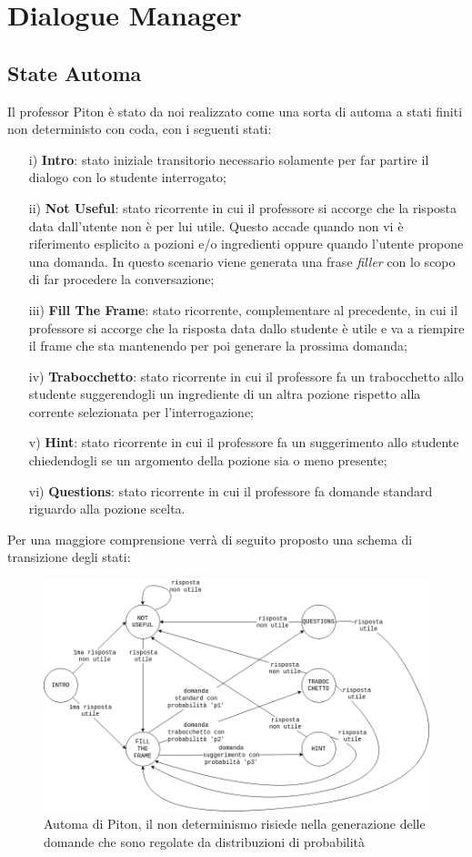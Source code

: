 \section{Dialogue Manager}
\subsection{State Automa}
Il professor Piton è stato da noi realizzato come una sorta di automa a stati finiti non deterministo con coda, con i seguenti stati:
\begin{itemize}
    \item[i)]\textbf{Intro}: stato iniziale transitorio necessario solamente per far partire il dialogo con lo studente interrogato;
    \item[ii)]\textbf{Not Useful}: stato ricorrente in cui il professore si accorge che la risposta data dall'utente non è per lui utile. Questo accade quando non vi è riferimento esplicito a pozioni e/o ingredienti oppure quando l'utente propone una domanda. In questo scenario viene generata una frase \textit{filler} con lo scopo di far procedere la conversazione;
    \item[iii)]\textbf{Fill The Frame}: stato ricorrente, complementare al precedente, in cui il professore si accorge che la risposta data dallo studente è utile e va a riempire il frame che sta mantenendo per poi generare la prossima domanda;
    \item[iv)]\textbf{Trabocchetto}: stato ricorrente in cui il professore fa un trabocchetto allo studente suggerendogli un ingrediente di un altra pozione rispetto alla corrente selezionata per l'interrogazione;
    \item[v)]\textbf{Hint}: stato ricorrente in cui il professore fa un suggerimento allo studente chiedendogli se un argomento della pozione sia o meno presente;
    \item[vi)]\textbf{Questions}: stato ricorrente in cui il professore fa domande standard riguardo alla pozione scelta.
\end{itemize}
Per una maggiore comprensione verrà di seguito proposto una schema di transizione degli stati:
\begin{figure}[h]
\centerline{\includegraphics[scale=0.4]{Images/stateTransition.png}}
\caption{Automa di Piton, il non determinismo risiede nella generazione delle domande che sono regolate da distribuzioni di probabilità}
\label{fig:Automa}
\end{figure}

